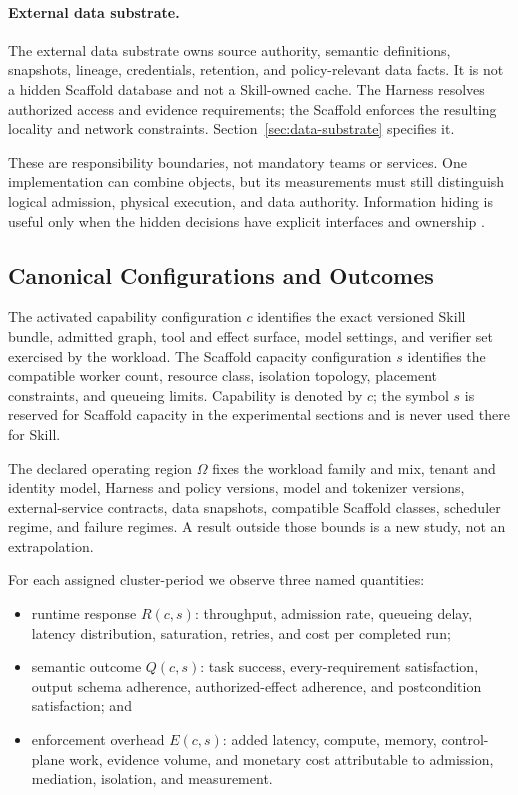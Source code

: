 \documentclass[11pt]{article}
\begin{document}
\paragraph{External data substrate.}
The external data substrate owns source authority, semantic definitions, snapshots, lineage, credentials, retention, and policy-relevant data facts. It is not a hidden Scaffold database and not a Skill-owned cache. The Harness resolves authorized access and evidence requirements; the Scaffold enforces the resulting locality and network constraints. Section~\ref{sec:data-substrate} specifies it.

These are responsibility boundaries, not mandatory teams or services. One implementation can combine objects, but its measurements must still distinguish logical admission, physical execution, and data authority. Information hiding is useful only when the hidden decisions have explicit interfaces and ownership \cite{parnas1972criteria}.

\subsection{Canonical Configurations and Outcomes}

The activated capability configuration $c$ identifies the exact versioned Skill bundle, admitted graph, tool and effect surface, model settings, and verifier set exercised by the workload. The Scaffold capacity configuration $s$ identifies the compatible worker count, resource class, isolation topology, placement constraints, and queueing limits. Capability is denoted by $c$; the symbol $s$ is reserved for Scaffold capacity in the experimental sections and is never used there for Skill.

The declared operating region $\Omega$ fixes the workload family and mix, tenant and identity model, Harness and policy versions, model and tokenizer versions, external-service contracts, data snapshots, compatible Scaffold classes, scheduler regime, and failure regimes. A result outside those bounds is a new study, not an extrapolation.

For each assigned cluster-period we observe three named quantities:

\begin{itemize}
\item runtime response $R(c,s)$: throughput, admission rate, queueing delay, latency distribution, saturation, retries, and cost per completed run;
\item semantic outcome $Q(c,s)$: task success, every-requirement satisfaction, output schema adherence, authorized-effect adherence, and postcondition satisfaction; and
\item enforcement overhead $E(c,s)$: added latency, compute, memory, control-plane work, evidence volume, and monetary cost attributable to admission, mediation, isolation, and measurement.
\end{itemize}
\end{document}
